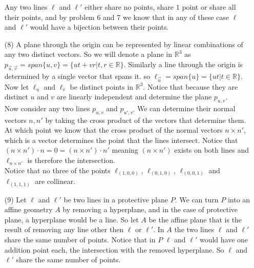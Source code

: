 \documentclass[12pt]{amsart}
\theoremstyle{definition}
\newcommand{\R}{\mathbb{R}}
\begin{document}
\begin{itemize}
 Any two lines $\ell$ and $\ell'$ either share no points, share $1$ point or share all their points, and by problem 6 and 7 we know that in any of these case $\ell$ and $\ell'$ would have a bijection between their points.\\

 \item[(8)]
A plane through the origin can be represented by linear combinations of any two distinct vectors. So we will denote a plane in $\R^3$ as $p_{\vec{u},\vec{v}}=span\{u,v\}=\{ut+vr|t,r\in\R\}$. Similarly a line through the origin is determined by a single vector that spans it. so $\ell_{\vec{u}}=span\{u\}=\{ut|t\in\R\}$. Now let $\ell_u$ and $\ell_v$ be distinct points in $\R^3$. Notice that because they are distinct $u$ and $v$ are linearly independent and determine the plane $p_{u,v}$.\\ 

Now consider any two lines $p_{u,v}$ and $p_{u',v'}$ We can determine their normal vectors $n,n'$ by taking the cross product of the vectors that determine them. At which point we know that the cross product of the normal vectors $n\times n'$, which is a vector determines the point that the lines intersect. Notice that $(n\times n')\cdot n=0=(n\times n')\cdot n'$ meaning $(n\times n')$ exists on both lines and $\ell_{n\times n'}$ is therefore the intersection.\\

Notice that no three of the points $\ell_{(1,0,0)}$, $\ell_{(0,1,0)}$, $\ell_{(0,0,1)}$ and $\ell_{(1,1,1)}$ are collinear.\\

\item[(9)] Let $\ell$ and $\ell'$ be two lines in a protective plane $P$. We can turn $P$ into an affine geometry $A$ by removing a hyperplane, and in the case of protective plane, a hyperplane would be a line. So let $A$ be the affine plane that is the result of removing any line other then $\ell$ or $\ell'$. In $A$ the two lines $\ell$ and $\ell'$ share the same number of points. Notice that in $P$ $\ell$ and $\ell'$ would have one addition point each, the intersection with the removed hyperplane. So $\ell$ and $\ell'$ share the same number of points.
\end{itemize}
\end{document}
